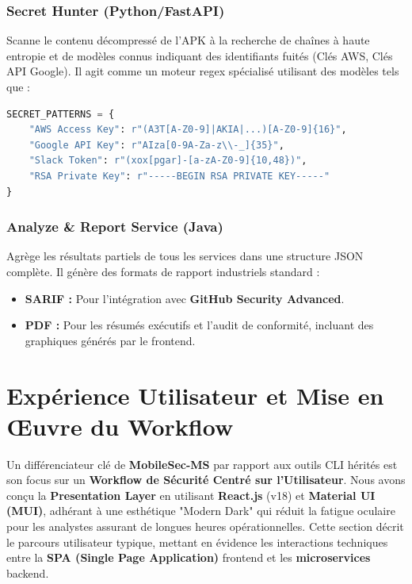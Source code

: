 \documentclass[
  journal=largetwo,
  manuscript=article-type,
  year=2025,
  volume=1,
]{cup-journal}
\begin{document}
\subsubsection{Secret Hunter (Python/FastAPI)}
Scanne le contenu décompressé de l'APK à la recherche de chaînes à haute entropie et de modèles connus indiquant des identifiants fuités (Clés AWS, Clés API Google). Il agit comme un moteur regex spécialisé utilisant des modèles tels que :
\begin{lstlisting}[language=python, caption={Modèles Regex pour la Détection de Secrets}]
SECRET_PATTERNS = {
    "AWS Access Key": r"(A3T[A-Z0-9]|AKIA|...)[A-Z0-9]{16}",
    "Google API Key": r"AIza[0-9A-Za-z\\-_]{35}",
    "Slack Token": r"(xox[pgar]-[a-zA-Z0-9]{10,48})",
    "RSA Private Key": r"-----BEGIN RSA PRIVATE KEY-----"
}
\end{lstlisting}

\subsubsection{Analyze \& Report Service (Java)}
Agrège les résultats partiels de tous les services dans une structure JSON complète. Il génère des formats de rapport industriels standard :
\begin{itemize}
    \item \textbf{SARIF :} Pour l'intégration avec \textbf{GitHub Security Advanced}.
    \item \textbf{PDF :} Pour les résumés exécutifs et l'audit de conformité, incluant des graphiques générés par le frontend.
\end{itemize}

\section{Expérience Utilisateur et Mise en Œuvre du Workflow}
\label{sec:ux}

Un différenciateur clé de \textbf{MobileSec-MS} par rapport aux outils CLI hérités est son focus sur un \textbf{Workflow de Sécurité Centré sur l'Utilisateur}. Nous avons conçu la \textbf{Presentation Layer} en utilisant \textbf{React.js} (v18) et \textbf{Material UI (MUI)}, adhérant à une esthétique "Modern Dark" qui réduit la fatigue oculaire pour les analystes assurant de longues heures opérationnelles. Cette section décrit le parcours utilisateur typique, mettant en évidence les interactions techniques entre la \textbf{SPA (Single Page Application)} frontend et les \textbf{microservices} backend.
\end{document}
